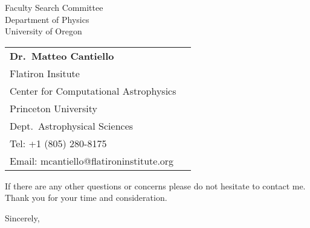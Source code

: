 \documentclass[11pt]{letter}
\begin{document}
\begin{letter}{
               Faculty Search Committee \\
               Department of Physics \\
               University of Oregon
           }
\begin{tabular}{ll}
        \textbf{Dr.~Matteo Cantiello}                          & \\
         Flatiron Insitute                                     & \\
         \hspace{0.2in}Center for Computational Astrophysics   & \\
         Princeton University                                  & \\
         \hspace{0.2in}Dept.~Astrophysical Sciences & \\
         Tel: +1 (805) 280-8175  & \\
         Email: mcantiello@flatironinstitute.org & \\
    \end{tabular}

    \normalsize
    If there are any other questions or concerns please do not hesitate to contact me.
    Thank you for your time and consideration.

\closing{Sincerely,}
\vspace{-0.9in}
\\
\end{letter}
\end{document}
